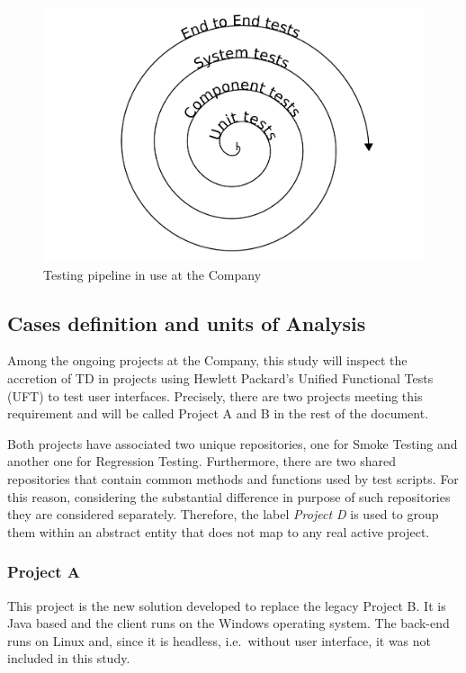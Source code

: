 \begin{figure}[hbt]
    \centering
    \includegraphics[width=\textwidth]{figure/testing_pipeline.pdf}
    \caption{Testing pipeline in use at the Company}
    \label{fig:testing_pipeline}
\end{figure}

\subsection{Cases definition and units of Analysis} \label{sec:cases_definition}

Among the ongoing projects at the Company, this study will inspect the accretion of TD in projects using Hewlett Packard's Unified Functional Tests (UFT) to test user interfaces. Precisely, there are two projects meeting this requirement and will be called Project A and B in the rest of the document.

Both projects have associated two unique repositories, one for Smoke Testing and another one for Regression Testing. Furthermore, there are two shared repositories that contain common methods and functions used by test scripts. For this reason, considering the substantial difference in purpose of such repositories they are considered separately. Therefore, the label \textit{Project D} is used to group them within an abstract entity that does not map to any real active project.


\subsubsection{Project A}
This project is the new solution developed to replace the legacy Project B. It is Java based and the client runs on the Windows operating system. The back-end runs on Linux and, since it is headless, i.e.\ without user interface, it was not included in this study.


